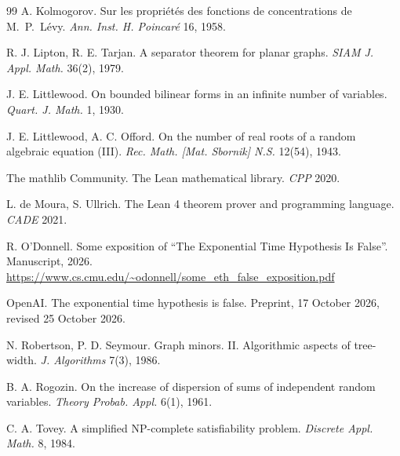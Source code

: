 \documentclass[11pt,a4paper]{article}
\theoremstyle{definition}
\theoremstyle{remark}
\begin{document}
\begin{thebibliography}{99}
 A. Kolmogorov. Sur les propri\'et\'es des fonctions de concentrations de
 M.~P.~L\'evy. \emph{Ann. Inst. H. Poincar\'e} 16, 1958.

 R. J. Lipton, R. E. Tarjan. A separator theorem for planar graphs.
 \emph{SIAM J. Appl. Math.} 36(2), 1979.

 J. E. Littlewood. On bounded bilinear forms in an infinite number of
 variables. \emph{Quart. J. Math.} 1, 1930.

 J. E. Littlewood, A. C. Offord. On the number of real roots of a random
 algebraic equation (III). \emph{Rec. Math. [Mat. Sbornik] N.S.} 12(54), 1943.

 The mathlib Community. The Lean mathematical library. \emph{CPP} 2020.

 L. de Moura, S. Ullrich. The Lean 4 theorem prover and programming language.
 \emph{CADE} 2021.

 R. O'Donnell. Some exposition of ``The Exponential Time Hypothesis Is
 False''. Manuscript, 2026.
 \url{https://www.cs.cmu.edu/~odonnell/some_eth_false_exposition.pdf}

 OpenAI. The exponential time hypothesis is false. Preprint, 17 October 2026,
 revised 25 October 2026.

 N. Robertson, P. D. Seymour. Graph minors. II. Algorithmic aspects of
 tree-width. \emph{J. Algorithms} 7(3), 1986.

 B. A. Rogozin. On the increase of dispersion of sums of independent random
 variables. \emph{Theory Probab. Appl.} 6(1), 1961.

 C. A. Tovey. A simplified NP-complete satisfiability problem.
 \emph{Discrete Appl. Math.} 8, 1984.

\end{thebibliography}
\end{document}
